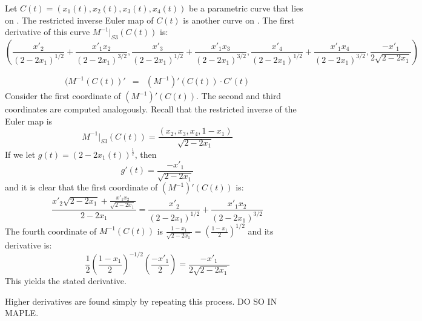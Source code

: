 \documentclass[12pt]{article}
\begin{document}
\begin{lemma}
Let $C(t) = (x_1(t),x_2(t),x_3(t),x_4(t))$ be a parametric curve that lies on .
The restricted inverse Euler map of $C(t)$ is another curve on .
The first derivative of this curve $M^{-1}|_{S3}(C(t))$ is:
\[
(\frac{x'_2}{(2-2x_1)^{1/2}} + \frac{x'_1x_2}{(2-2x_1)^{3/2}}, 
 \frac{x'_3}{(2-2x_1)^{1/2}} + \frac{x'_1x_3}{(2-2x_1)^{3/2}},
 \frac{x'_4}{(2-2x_1)^{1/2}} + \frac{x'_1x_4}{(2-2x_1)^{3/2}},
 \frac{-x'_1}{2\sqrt{2-2x_1}})
\]
\end{lemma}
\prf
\begin{eqnarray*}
(M^{-1}(C(t))' & = & (M^{-1})'(C(t)) \cdot C'(t)
\end{eqnarray*}
Consider the first coordinate of $(M^{-1})'(C(t))$.
The second and third coordinates are computed analogously.
Recall that the restricted inverse of the Euler map is
\[
M^{-1}|_{S3}(C(t)) = \frac{(x_2,x_3,x_4,1-x_1)}{\sqrt{2-2x_1}}
\]
If we let $g(t) = (2-2x_1(t))^{\frac{1}{2}}$, then
\[
g'(t) = \frac{-x'_1}{\sqrt{2-2x_1}}
\]
and it is clear that the first coordinate of $(M^{-1})'(C(t))$ is:
\[
\frac{x'_2 \sqrt{2-2x_1} + \frac{x'_1 x_2}{\sqrt{2-2x_1}}}{2-2x_1}
= \frac{x'_2}{(2-2x_1)^{1/2}} + \frac{x'_1x_2}{(2-2x_1)^{3/2}}
\]
The fourth coordinate of $M^{-1}(C(t))$ is 
$\frac{1-x_1}{\sqrt{2-2x_1}} = (\frac{1-x_1}{2})^{1/2}$
and its derivative is:
\[
\frac{1}{2} (\frac{1-x_1}{2})^{-1/2}(\frac{-x'_1}{2})
= \frac{-x'_1}{2\sqrt{2-2x_1}}
\]
This yields the stated derivative.
\QED

Higher derivatives are found simply by repeating this process. 
DO SO IN MAPLE.

\clearpage
\end{document}
